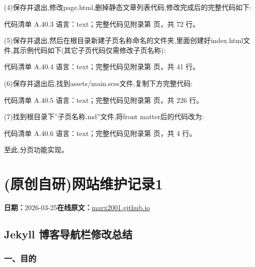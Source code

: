 \documentclass[lang=cn,scheme=chinese,color=blue,device=normal,toc=onecol,math=cm]{elegantbook}
\begin{document}
(4)保存并退出,修改page.html,删掉静态文章列表代码,修改完成后的完整代码如下:\par


\begin{codeindexbox}{代码清单 A.40.3}
语言：text；完整代码见附录第 \pageref{code:40:3} 页，共 72 行。
\end{codeindexbox}


(5)保存并退出,然后在根目录新建子页名称命名的文件夹,里面创建好index.html文件,其示例代码如下(其它子页代码仅需修改子页名称):\par


\begin{codeindexbox}{代码清单 A.40.4}
语言：text；完整代码见附录第 \pageref{code:40:4} 页，共 41 行。
\end{codeindexbox}


(6)保存并退出后,找到assets/\allowbreak{}main.scss文件,复制下方完整代码:\par


\begin{codeindexbox}{代码清单 A.40.5}
语言：text；完整代码见附录第 \pageref{code:40:5} 页，共 226 行。
\end{codeindexbox}


(7)找到根目录下”子页名称.md”文件,将front matter后的代码改为:\par


\begin{codeindexbox}{代码清单 A.40.6}
语言：text；完整代码见附录第 \pageref{code:40:6} 页，共 4 行。
\end{codeindexbox}


至此,分页功能实现。\par



\section{(原创自研)网站维护记录1}
\begin{articlemeta}
\textbf{日期：}2026-03-25\hfill\textbf{在线原文：}\href{https://marx2001.github.io/sci-note\_posts/20260326change-web}{marx2001.github.io}
\end{articlemeta}

\subsection{Jekyll 博客导航栏修改总结}


\subsubsection{一、目的}
\end{document}
